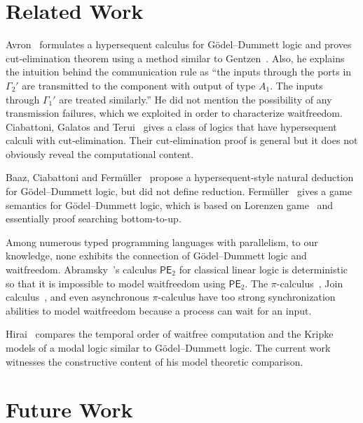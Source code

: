 {\section{Related Work}
\label{related}
Avron~\cite{avron91} formulates a
hypersequent calculus for G\"odel--Dummett logic and proves
cut-elimination theorem using a method
similar to Gentzen~\cite{gentzen}.
Also, he explains the intuition behind the communication rule as
``the inputs through the ports in $\Gamma_2'$ are transmitted to the
component with output of type $A_1.$  The inputs through $\Gamma_1'$ are
treated similarly.''  He did not mention the possibility of
any transmission failures, which we exploited
in order to characterize waitfreedom.
Ciabattoni, Galatos and Terui~\cite{alg} gives a class of logics
that have
hypersequent calculi with
cut-elimination.
Their cut-elimination proof is general but it does not
obviously reveal the computational content.

Baaz, Ciabattoni and Ferm\"uller~\cite{natural} propose a
hypersequent-style natural deduction for G\"odel--Dummett logic, but
did not define reduction.
Ferm\"uller~\cite{parallel} gives a game semantics for G\"odel--Dummett
logic, which is based on Lorenzen game~\cite{curryhoward} and essentially
proof searching bottom-to-up.

Among numerous typed programming languages with parallelism,
to our knowledge, none exhibits
the connection of G\"odel--Dummett logic and waitfreedom.
Abramsky~\cite{abramsky1993computational}'s calculus $\mathsf{PE}_2$
for classical linear logic is
deterministic
\cite[Theorem~7.9]{abramsky1993computational} so that it is
impossible to model
waitfreedom using $\mathsf{PE}_2$.
The $\pi$-calculus~\cite{milner1999communicating},
Join calculus~\cite{join},
and even asynchronous
$\pi$-calculus \cite{hondatokoro}
have too strong synchronization abilities to model waitfreedom because
a process can wait for an input.

Hirai~\cite{hirailpar} compares the temporal order of waitfree
computation and the Kripke models of a modal logic similar to
G\"odel--Dummett logic.  The current
work witnesses the constructive content of
his model theoretic comparison.

\section{Future Work}
\label{future}

}
